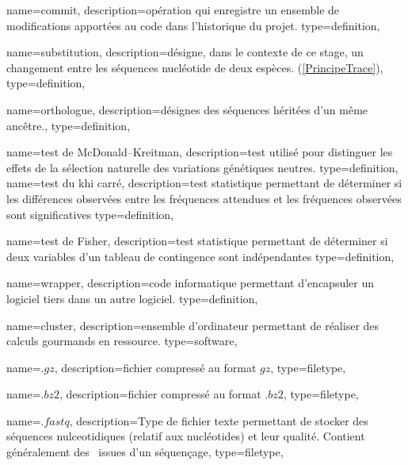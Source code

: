  {
    name=commit,
    description={opération qui enregistre un ensemble de modifications apportées au code dans l'historique du projet.}
     type=definition,
}


 {
    name=substitution,
    description={désigne, dans le contexte de ce stage, un changement entre les séquences nucléotide de deux espèces. (\cref{PrincipeTrace})},
     type=definition,
}

 {
    name=orthologue,
    description={désignes des séquences héritées d'un même ancêtre.},
     type=definition,
}

 {
    name=test de McDonald–Kreitman,
    description={test utilisé pour distinguer les effets de la sélection naturelle des variations génétiques neutres.}
     type=definition,
}
 {
    name=test du khi carré,
    description={test statistique permettant de déterminer si les différences observées entre les fréquences attendues et les fréquences observées sont significatives}
     type=definition,
}

 {
    name=test de Fisher,
    description={test statistique permettant de déterminer si deux variables d'un tableau de contingence sont indépendantes}
     type=definition,
}

 {
    name=wrapper,
    description={code informatique permettant d'encapsuler un logiciel tiers dans un autre logiciel.}
     type=definition,
}

 {
    name=cluster,
    description={ensemble d'ordinateur permettant de réaliser des calculs gourmands en ressource.}
     type=software,
}

 {
    name=$.gz$,
    description={fichier compressé au format $gz$},
    type=filetype,
}
\newcommand{\gz}{"\gls{gz}"}

 {
    name=$.bz2$,
    description={fichier compressé au format $.bz2$},
    type=filetype,
}
\newcommand{\bz}{"\gls{bz}"}


 {
    name=$.fastq$,
    description={Type de fichier texte permettant de stocker des séquences nulceotidiques (relatif aux \glspl{nucléotide}) et leur qualité. Contient généralement des \reads issues d'un \gls{séquençage}},
    type=filetype,
}
\newcommand{\fastq}{"\gls{fastq}"}


